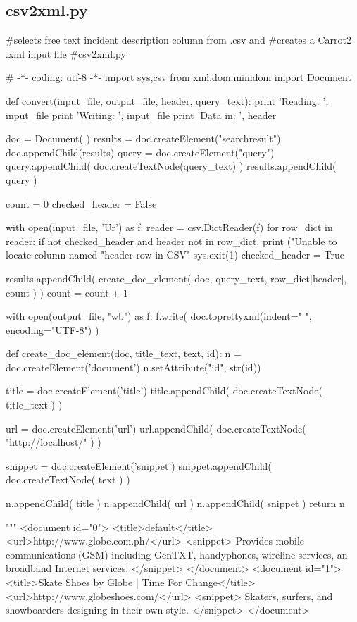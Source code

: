 \subsection{csv2xml.py}
\label{csv2xml.py}
\begin{pyverbatim}
 #selects free text incident description column from .csv and
 #creates a Carrot2 .xml input file
 #csv2xml.py

 # -*- coding: utf-8 -*-
import sys,csv
from xml.dom.minidom import Document

def convert(input_file, output_file, header, query_text):
    print 'Reading: ', input_file
    print 'Writing: ', input_file
    print 'Data in: ', header

    doc = Document(  )
    results = doc.createElement("searchresult")
    doc.appendChild(results)
    query = doc.createElement("query")
    query.appendChild( doc.createTextNode(query_text) )
    results.appendChild( query )

    count = 0
    checked_header = False

    with open(input_file, 'Ur') as f:
        reader = csv.DictReader(f)
        for row_dict in reader:
            if not checked_header and header not in row_dict:
                print ("Unable to locate column named %
                         "header row in CSV" %
                sys.exit(1)
            checked_header = True

            results.appendChild( create_doc_element( doc, query_text,
                                                    row_dict[header], count ) )
            count = count + 1

    with open(output_file, "wb") as f:
        f.write( doc.toprettyxml(indent="  ", encoding="UTF-8") )

def create_doc_element(doc, title_text, text, id):
    n = doc.createElement('document')
    n.setAttribute("id", str(id))

    title = doc.createElement('title')
    title.appendChild( doc.createTextNode( title_text ) )

    url = doc.createElement('url')
    url.appendChild( doc.createTextNode( "http://localhost/" ) )

    snippet = doc.createElement('snippet')
    snippet.appendChild( doc.createTextNode( text ) )


    n.appendChild( title )
    n.appendChild( url )
    n.appendChild( snippet )
    return n

"""  <document id="0">
    <title>default</title>
    <url>http://www.globe.com.ph/</url>
    <snippet>
      Provides mobile communications (GSM) including
      GenTXT, handyphones, wireline services, an
      broadband Internet services.
    </snippet>
  </document>
  <document id="1">
    <title>Skate Shoes by Globe | Time For Change</title>
    <url>http://www.globeshoes.com/</url>
    <snippet>
      Skaters, surfers, and showboarders
      designing in their own style.
    </snippet>
  </document>


\end{pyverbatim}
